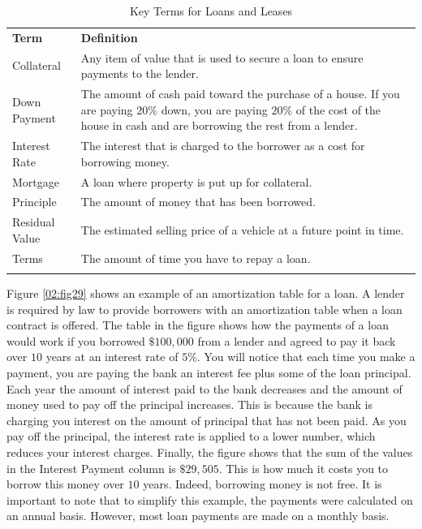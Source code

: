{\small
	\begin{longtable}{p{0.75in}p{3.5in}}
		\textbf{Term} & \textbf{Definition}\endhead
		\hline \\
		Collateral & Any item of value that is used to secure a loan to ensure payments to the lender.\\
		Down Payment & The amount of cash paid toward the purchase of a house. If you are paying $ 20\% $ down, you are paying $ 20\% $ of the cost of the house in cash and are borrowing the rest from a lender.\\
		Interest Rate & The interest that is charged to the borrower as a cost for borrowing money.\\
		Mortgage & A loan where property is put up for collateral.\\
		Principle & The amount of money that has been borrowed.\\
		Residual Value & The estimated selling price of a vehicle at a future point in time.\\
		Terms & The amount of time you have to repay a loan.\\
		\caption{Key Terms for Loans and Leases}
		\label{02:tab05}
	\end{longtable}
}

Figure \ref{02:fig29} shows an example of an amortization table for a loan. A lender is required by law to provide borrowers with an amortization table when a loan contract is offered. The table in the figure shows how the payments of a loan would work if you borrowed $ \$100,000 $ from a lender and agreed to pay it back over $ 10 $ years at an interest rate of $ 5\% $. You will notice that each time you make a payment, you are paying the bank an interest fee plus some of the loan principal. Each year the amount of interest paid to the bank decreases and the amount of money used to pay off the principal increases. This is because the bank is charging you interest on the amount of principal that has not been paid. As you pay off the principal, the interest rate is applied to a lower number, which reduces your interest charges. Finally, the figure shows that the sum of the values in the Interest Payment column is $ \$29,505 $. This is how much it costs you to borrow this money over $ 10 $ years. Indeed, borrowing money is not free. It is important to note that to simplify this example, the payments were calculated on an annual basis. However, most loan payments are made on a monthly basis.

